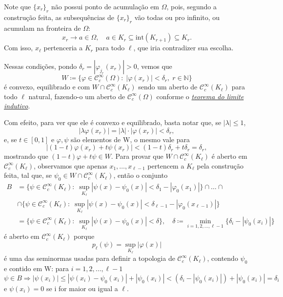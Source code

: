\documentclass[../distribution_theory_notes.tex]{subfiles}
\begin{document}
\begin{proof*}
	Note que \(\{x_r\}_r\) não possui ponto de acumulação em \(\Omega \), pois, segundo a construção feita, as subsequências de \(\{x_r\}_r\) vão todas ou pro infinito, ou acumulam na fronteira de \(\Omega \):
	\[
		x_r\rightarrow a\in \Omega,\quad a\in K_r \subseteq \mathrm{int}(K_{r+1})\subseteq K_r.
	\]
	Com isso, \(x_{\ell }\) pertenceria a \(K_r\) para todo \(\ell \), que iria contradizer sua escolha.

	Nessas condições, pondo \(\delta_r = |\varphi_{j_r}(x_r)|>0\), vemos que
	\[
		W\coloneqq \{\varphi\in \mathcal{C}_{c}^{\infty}(\Omega ):\; |\varphi(x_r)|<\delta_r,\; r\in \mathbb{N}\}
	\]
	é convexo, equilibrado e com \(W\cap \mathcal{C}_{c}^{\infty}(K_{\ell})\) sendo um aberto de \(\mathcal{C}_{c}^{\infty}(K_{\ell})\) para todo \(\ell \) natural, fazendo-o um aberto de \(\mathcal{C}_{c}^{\infty}(\Omega )\) conforme o \hyperlink{inductive_limit}{\textit{teorema do limite indutivo}}.

	Com efeito, para ver que ele é convexo e equilibrado, basta notar que, se \(|\lambda |\leq 1\),
	\[
		|\lambda \varphi (x_r)| = |\lambda |\cdot |\varphi(x_r)|<\delta_r,
	\]
	e, se \(t\in [0,1]\) e \(\varphi , \psi\) são elementos de W, o mesmo vale para
	\[
		|(1-t)\varphi (x_r)+t\psi (x_r)|<(1-t)\delta_r+ t\delta_r = \delta_r,
	\]
	mostrando que \((1-t)\varphi + t\psi \in W\). Para provar que \(W\cap \mathcal{C}_{c}^{\infty}(K_{\ell})\) é aberto em \(\mathcal{C}_{c}^{\infty}(K_{\ell})\), observamos que apenas \(x_1,\dotsc ,x_{\ell -1}\) pertencem a \(K_{\ell}\) pela construção feita, tal que, se \(\psi_{0}\in W\cap \mathcal{C}_{c}^{\infty}(K_{\ell})\), então o conjunto
	\begin{align*}
		B & =\{\psi \in \mathcal{C}_{c}^{\infty}(K_{\ell}):\; \sup_{K_{\ell}}|\psi (x)-\psi_{0}(x)|<\delta_1-|\varphi_{0}(x_1)|\}\cap \dotsc \cap                                                         \\
		  & \cap \{\psi \in \mathcal{C}_{c}^{\infty}(K_{\ell}):\; \sup_{K_{\ell}}|\psi (x)-\psi_{0}(x)|<\delta_{\ell -1}-|\varphi_{0}(x_{\ell -1})|\}                                                     \\
		  & = \{\psi  \in \mathcal{C}_{c}^{\infty}(K_{\ell}):\; \sup_{K_{\ell}}|\psi (x)-\psi_{0}(x)|<\delta \},\quad \delta\coloneqq \min\limits_{i=1,2,\dotsc ,\ell -1}\{\delta_{i}-|\psi_{0}(x_{i})|\}
	\end{align*}
	é aberto em \(\mathcal{C}_{c}^{\infty}(K_{\ell})\) porque
	\[
		p_{\ell}(\psi )=\sup_{K_{\ell}}|\varphi(x)|
	\]
	é uma das seminormas usadas para definir a topologia de \(\mathcal{C}_{c}^{\infty}(K_{\ell})\), contendo \(\psi_{0}\) e contido em W: para \(i=1,2,\dotsc , \ell -1\)
	\[
		\psi\in B \Rightarrow |\psi(x_{i})|\leq |\psi (x_{i})-\psi_{0}(x_{i})|+|\psi_{0}(x_{i})| < (\delta_{i}-|\psi_{0}(x_{i})|)+|\psi_{0}(x_{i})| = \delta_{i}
	\]
	e \(\psi (x_{i})=0\) se i for maior ou igual a \(\ell .\)


\end{proof*}
\end{document}
